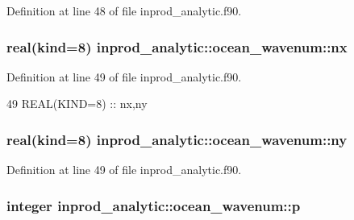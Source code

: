 Definition at line 48 of file inprod\+\_\+analytic.\+f90.

\subsubsection[{\texorpdfstring{nx}{nx}}]{\setlength{\rightskip}{0pt plus 5cm}real(kind=8) inprod\+\_\+analytic\+::ocean\+\_\+wavenum\+::nx\hspace{0.3cm}{\ttfamily [private]}}\hypertarget{structinprod__analytic_1_1ocean__wavenum_a6084ea7c554f942e74779a2be38b7d3d}{}\label{structinprod__analytic_1_1ocean__wavenum_a6084ea7c554f942e74779a2be38b7d3d}


Definition at line 49 of file inprod\+\_\+analytic.\+f90.


\begin{DoxyCode}
49      \textcolor{keywordtype}{REAL(KIND=8)} :: nx,ny
\end{DoxyCode}
\subsubsection[{\texorpdfstring{ny}{ny}}]{\setlength{\rightskip}{0pt plus 5cm}real(kind=8) inprod\+\_\+analytic\+::ocean\+\_\+wavenum\+::ny\hspace{0.3cm}{\ttfamily [private]}}\hypertarget{structinprod__analytic_1_1ocean__wavenum_a0738c305f503d7864a9073c5cea352ab}{}\label{structinprod__analytic_1_1ocean__wavenum_a0738c305f503d7864a9073c5cea352ab}


Definition at line 49 of file inprod\+\_\+analytic.\+f90.

\subsubsection[{\texorpdfstring{p}{p}}]{\setlength{\rightskip}{0pt plus 5cm}integer inprod\+\_\+analytic\+::ocean\+\_\+wavenum\+::p\hspace{0.3cm}{\ttfamily [private]}}\hypertarget{structinprod__analytic_1_1ocean__wavenum_a3170ff1b2a81b58ae81527a964682c06}{}\label{structinprod__analytic_1_1ocean__wavenum_a3170ff1b2a81b58ae81527a964682c06}


